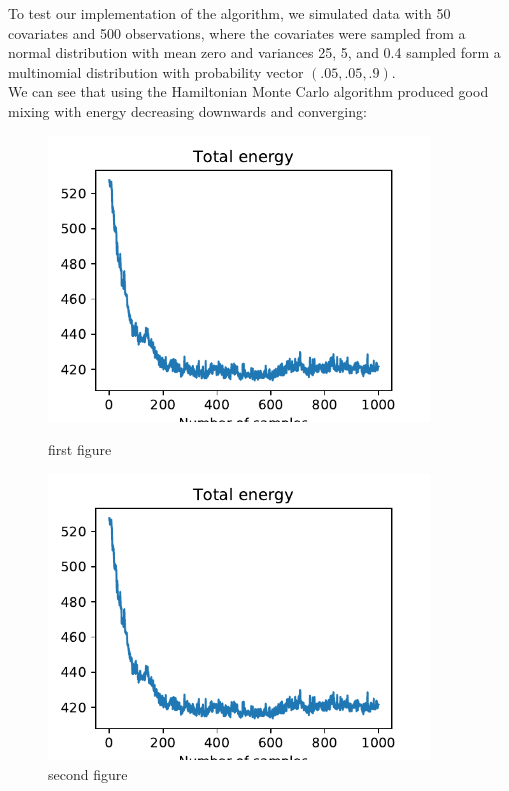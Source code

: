 To test our implementation of the algorithm, we simulated data with 50 covariates and 500 observations, where the covariates were sampled from a normal distribution with mean zero and variances 25, 5, and 0.4 sampled form a multinomial distribution with probability vector $(.05, .05, .9)$.\\

We can see that using the Hamiltonian Monte Carlo algorithm produced good mixing with energy decreasing downwards and converging:

\begin{figure}[h!]
	\centering
	\begin{minipage}{0.45\textwidth}
		\centering
		\includegraphics[width=0.9\textwidth]{hmc-energy-pima.pdf} %
		\caption{first figure}
	\end{minipage}\hfill
	\begin{minipage}{0.45\textwidth}
		\centering
		\includegraphics[width=0.9\textwidth]{hmc-energy-pima.pdf} %
		\caption{second figure}
	\end{minipage}
\end{figure}


